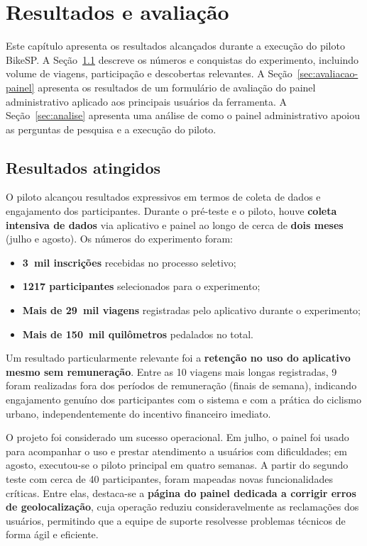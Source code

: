 
\chapter{Resultados e avaliação}
\label{cap:resultados}

Este capítulo apresenta os resultados alcançados durante a execução do piloto BikeSP. A Seção~\ref{sec:resultados-atingidos} descreve os números e conquistas do experimento, incluindo volume de viagens, participação e descobertas relevantes. A Seção~\ref{sec:avaliacao-painel} apresenta os resultados de um formulário de avaliação do painel administrativo aplicado aos principais usuários da ferramenta. A Seção~\ref{sec:analise} apresenta uma análise de como o painel administrativo apoiou as perguntas de pesquisa e a execução do piloto.

\section{Resultados atingidos}
\label{sec:resultados-atingidos}
O piloto alcançou resultados expressivos em termos de coleta de dados e
engajamento dos participantes. Durante o pré-teste e o piloto, houve
\textbf{coleta intensiva de dados} via aplicativo e painel ao longo de cerca de
\textbf{dois meses} (julho e agosto). Os números do experimento foram:
\begin{itemize}
  \item \textbf{3~mil inscrições} recebidas no processo seletivo;
  \item \textbf{1217 participantes} selecionados para o experimento;
  \item \textbf{Mais de 29~mil viagens} registradas pelo aplicativo durante o
        experimento;
  \item \textbf{Mais de 150~mil quilômetros} pedalados no total.
\end{itemize}

Um resultado particularmente relevante foi a \textbf{retenção no uso do
aplicativo mesmo sem remuneração}. Entre as 10 viagens mais longas registradas,
9 foram realizadas fora dos períodos de remuneração (finais de semana),
indicando engajamento genuíno dos participantes com o sistema e com a prática do
ciclismo urbano, independentemente do incentivo financeiro imediato.

O projeto foi considerado um sucesso operacional. Em julho, o painel foi usado
para acompanhar o uso e prestar atendimento a usuários com dificuldades; em
agosto, executou-se o piloto principal em quatro semanas. A partir do segundo
teste com cerca de 40 participantes, foram mapeadas novas funcionalidades
críticas. Entre elas, destaca-se a \textbf{página do painel dedicada a corrigir
erros de geolocalização}, cuja operação reduziu consideravelmente as reclamações
dos usuários, permitindo que a equipe de suporte resolvesse problemas técnicos
de forma ágil e eficiente.

